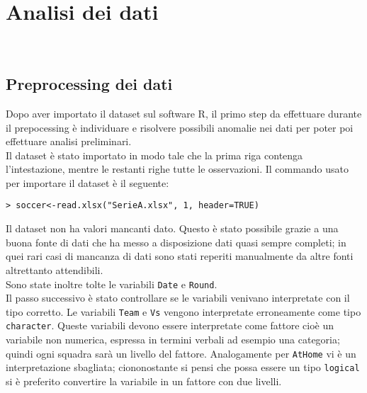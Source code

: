 
\chapter{Analisi dei dati}
\\


\section{Preprocessing dei dati}
Dopo aver importato il dataset sul software R, il primo step da effettuare durante il prepocessing è individuare e risolvere possibili anomalie nei dati per poter poi effettuare analisi preliminari.\\
Il dataset è stato importato in modo tale che la prima riga contenga l'intestazione, mentre le restanti righe tutte le osservazioni. Il commando usato per importare il dataset è il seguente:\\

\begin{lstlisting}
> soccer<-read.xlsx("SerieA.xlsx", 1, header=TRUE)
\end{lstlisting}
\bigskip
Il dataset non ha valori mancanti dato. Questo è stato possibile grazie a una buona fonte di dati che ha messo a disposizione dati quasi sempre completi; in quei rari casi di mancanza di dati sono stati reperiti manualmente da altre fonti altrettanto attendibili.\\
Sono state inoltre tolte le variabili \texttt{Date} e \texttt{Round}.\\
Il passo successivo è stato controllare se le variabili venivano interpretate con il tipo corretto. Le variabili \texttt{Team} e \texttt{Vs} vengono interpretate erroneamente come tipo \texttt{character}. Queste variabili devono essere interpretate come fattore cioè un variabile non numerica, espressa in termini verbali ad esempio una categoria; quindi ogni squadra sarà un livello del fattore. Analogamente per \texttt{AtHome} vi è un interpretazione sbagliata; ciononostante si pensi che possa essere un tipo \texttt{logical} si è preferito convertire la variabile in un fattore con due livelli.


